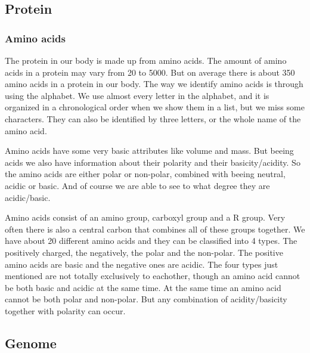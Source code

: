 \documentclass[UKenglish,11pt,twoside,a4paper]{report}
\begin{document}
\subsection*{Protein}
\subsubsection*{Amino acids}
The protein in our body is made up from amino acids. The amount of amino acids in a protein may vary from 20 to 5000. But
on average there is about 350 amino acids in a protein in our body. The way we identify amino acids is through using the
alphabet. We use almost every letter in the alphabet, and it is organized in a chronological order when we show
them in a list, but we miss some characters. They can also be identified by three letters, or the whole name of the
amino acid.

Amino acids have some very basic attributes like volume and mass. But beeing acids we also have information about their
polarity and their basicity/acidity. So the amino acids are either polar or non-polar, combined with beeing neutral,
acidic or basic. And of course we are able to see to what degree they are acidic/basic.

Amino acids consist of an amino group, carboxyl group and a R group. Very often there is also a central carbon that
combines all of these groups together. We have about 20 different amino acids and they can be classified into 4 types.
The positively charged, the negatively, the polar and the non-polar. The positive amino acids are basic and the negative
ones are acidic. The four types just mentioned are not totally exclusively to eachother, though an amino acid cannot be
both basic and acidic at the same time. At the same time an amino acid cannot be both polar and non-polar. But any
combination of acidity/basicity together with polarity can occur.
\subsection*{Genome}
\end{document}
